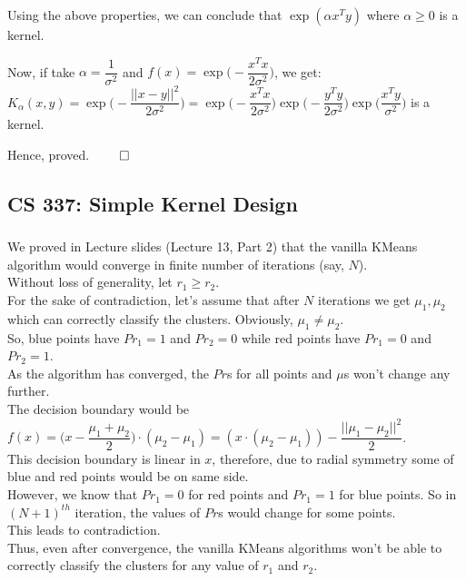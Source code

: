 \documentclass[12pt, fleqn]{article}
\begin{document}
Using the above properties, we can conclude that $\exp(\alpha x^T y)$ where $\alpha \ge 0$ is a kernel.

Now, if take $\alpha = \dfrac{1}{\sigma^2}$ and $f(x) = \exp\bigg(- \dfrac{x^T x}{2 \sigma^2}\bigg)$, we get: \\
$K_\alpha (x, y) = \exp\bigg(- \dfrac{||x - y||^2}{2 \sigma^2}\bigg) = \exp\bigg(- \dfrac{x^T x}{2 \sigma^2}\bigg) \exp\bigg(- \dfrac{y^T y}{2 \sigma^2}\bigg) \exp\bigg(\dfrac{x^T y}{\sigma^2}\bigg)$ is a kernel.

Hence, proved. \hfill $\qed$


\subsection{CS 337: Simple Kernel Design}
\subsubsection{}
We proved in Lecture slides (Lecture 13, Part 2) that the vanilla KMeans algorithm would converge in finite number of iterations (say, $N$). \\
Without loss of generality, let $r_1 \ge r_2$. \\
For the sake of contradiction, let's assume that after $N$ iterations we get ${\mu_1, \mu_2}$ which can correctly classify the clusters. Obviously, $\mu_1 \neq \mu_2$. \\
So, blue points have $Pr_1 = 1$ and $Pr_2 = 0$ while red points have $Pr_1 = 0$ and $Pr_2 = 1$. \\
As the algorithm has converged, the $Pr$s for all points and $\mu$s won't change any further. \\

The decision boundary would be $f(x) = \bigg(x - \dfrac{\mu_1 + \mu_2}{2}\bigg) \cdot (\mu_2 - \mu_1) = (x \cdot (\mu_2 - \mu_1)) - \dfrac{||\mu_1 - \mu_2||^2}{2}$. \\
This decision boundary is linear in $x$, therefore, due to radial symmetry some of blue and red points would be on same side. \\
However, we know that $Pr_1 = 0$ for red points and $Pr_1 = 1$ for blue points. So in $(N+1)^{th}$ iteration, the values of $Pr$s would change for some points. \\

This leads to contradiction. \\
Thus, even after convergence, the vanilla KMeans algorithms won't be able to correctly classify the clusters for any value of $r_1$ and $r_2$.

\subsubsection{}
\end{document}
